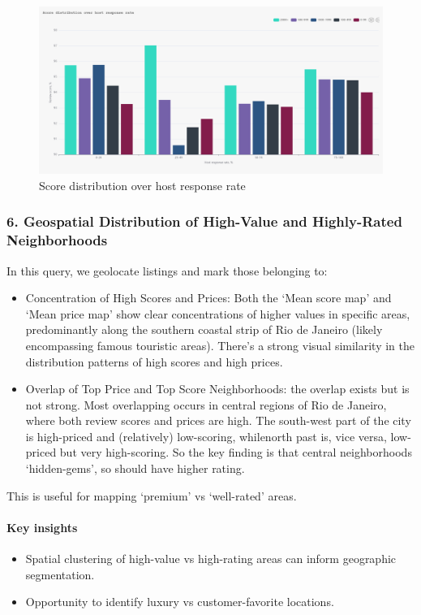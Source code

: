\vspace{1em}
\begin{figure}[H]
    \centering
    \includegraphics[width=1\textwidth]{images/q5_2.jpg}
    \caption{Score distribution over host response rate}\label{fig:figureq10}
\end{figure}


\subsubsection*{6. Geospatial Distribution of High-Value and Highly-Rated Neighborhoods}

In this query, we geolocate listings and mark those belonging to:
\begin{itemize}
    \item Concentration of High Scores and Prices: Both the `Mean score map' and `Mean price map' show clear concentrations of higher values in specific areas, predominantly along the southern coastal strip of Rio de Janeiro (likely encompassing famous touristic areas). There's a strong visual similarity in the distribution patterns of high scores and high prices.
    \item Overlap of Top Price and Top Score Neighborhoods: the overlap exists but is not strong. Most overlapping occurs in central regions of Rio de Janeiro, where both review scores and prices are high. The south-west part of the city is high-priced and (relatively) low-scoring, whilenorth past is, vice versa, low-priced but very high-scoring. So the key finding is that central neighborhoods `hidden-gems', so should have higher rating.
\end{itemize}

This is useful for mapping `premium' vs `well-rated' areas.

\vspace{0.5em}
\paragraph{Key insights}
\begin{itemize}
    \item Spatial clustering of high-value vs high-rating areas can inform geographic segmentation.
    \item Opportunity to identify luxury vs customer-favorite locations.
\end{itemize}

